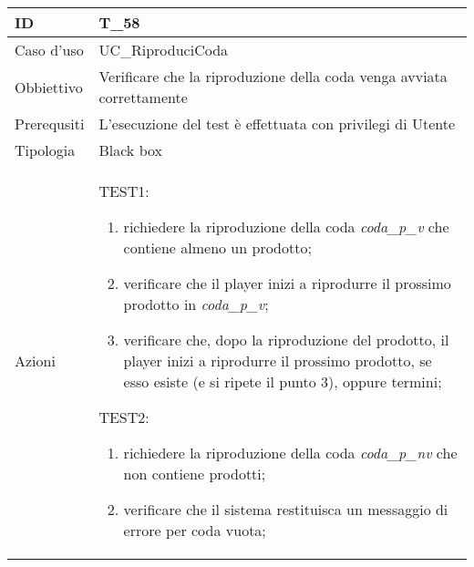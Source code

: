 \begin{table}[hb]
    \centering
    \begin{tabular}{ |p{2cm}|p{10cm}|  }
        \hline
        ID          & T\_58                                                                 \\\hline
        Caso d'uso  & UC\_RiproduciCoda                                                     \\\hline
        Obbiettivo  & Verificare che la riproduzione della coda venga avviata correttamente \\\hline
        Prerequsiti & L'esecuzione del test è effettuata con privilegi di Utente            \\\hline
        Tipologia   & Black box                                                             \\\hline
        Azioni      &
        TEST1:
        \begin{enumerate}[nosep, topsep=0pt]
            \item richiedere la riproduzione della coda \emph{coda\_p\_v} che contiene almeno un prodotto;
            \item verificare che il player inizi a riprodurre il prossimo prodotto in \emph{coda\_p\_v};
            \item verificare che, dopo la riproduzione del prodotto, il player inizi a riprodurre
                  il prossimo prodotto, se esso esiste (e si ripete il punto 3), oppure termini;
        \end{enumerate}
        \vspace{0.5cm} TEST2:
        \begin{enumerate}[nosep, topsep=0pt]
            \item richiedere la riproduzione della coda \emph{coda\_p\_nv} che non contiene prodotti;
            \item verificare che il sistema restituisca un messaggio di errore per coda vuota;
        \end{enumerate}
        \\\hline
    \end{tabular}
\end{table}

